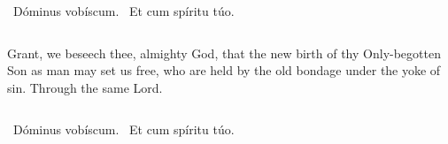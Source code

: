 {{  }

  {
    \medskip
  }

  \Vbar{}~Dóminus vobíscum. \Rbar{}~Et cum spíritu túo.
  \bigskip

  {


  }
  \smallskip

  {
    \begin{columns}
           {Grant, we beseech thee, almighty God, that the new birth of thy Only-begotten Son as man may set us free, who are held by the old bondage under the yoke of sin. Through the same Lord.}
    \end{columns}
  }
  \bigskip{}

  \Vbar{}~Dóminus vobíscum. \Rbar{}~Et cum spíritu túo.

  \bigskip{}
  {
    \large
  }
}